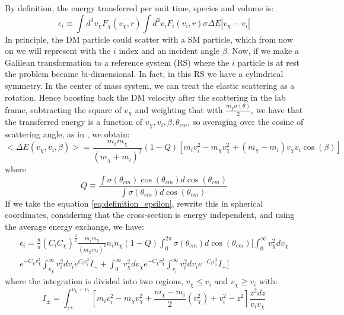 By definition, the energy transferred per unit time, species and volume is:
\begin{equation}
\label{eq:definition_epsilon}
    \epsilon_i\equiv \int d^3v_{\chi}F_{\chi}(v_{\chi},r)\int d^3v_i F_i(v_i,r)  \sigma \Delta E |v_{\chi}-v_i|
\end{equation}
In principle, the DM particle could scatter with a SM particle, which from now on we will represent with the $i$ index and an incident angle $\beta$. Now, if we make a Galilean transformation to a reference system (RS) where the $i$ particle is at rest the problem became bi-dimensional. In fact, in this RS  we have a cylindrical symmetry. In the center of mass system, we can treat the elastic scattering as a rotation. Hence boosting back the DM velocity after the scattering in the lab frame, subtracting the square of $v_{\chi}$ and weighting that with $\frac{m_{\chi}\sigma(\theta)}{2}$, we have that the transferred energy is a function of $v_{\chi},v_i,\beta,\theta_{cm}$, so averaging over the cosine of scattering angle, as in  \cite{SpergelPress_Cond}, we obtain:
\begin{equation}
    \Big< \Delta E (v_{\chi},v_i,\beta)\Big>=\frac{m_im_{\chi}}{(m_{\chi}+m_i)^2}(1-Q)[m_iv_i^2-m_{\chi}v_{\chi}^2+(m_{\chi}-m_i)v_{\chi}v_i\cos(\beta)]
\end{equation}
where
\begin{equation*}
    Q\equiv \frac{\int \sigma(\theta_{cm})\cos(\theta_{cm})d\cos(\theta_{cm})}{\int \sigma(\theta_{cm})d\cos(\theta_{cm})}
\end{equation*}
If we take the equation \ref{eq:definition_epsilon}, rewrite this in spherical coordinates, considering that the cross-section is energy independent, and using the average energy exchange, we have:
\begin{equation*}
\begin{split}
    \epsilon_i=\frac{8}{\pi}(C_iC_{\chi})^{\frac{3}{2}}\frac{m_im_{\chi}}{(m_{\chi}m_{i})^2}n_in_{\chi}(1-Q)\int_0^{2\pi} \sigma(\theta_{cm})d\cos(\theta_{cm}) \Bigg[\int_0^{\infty}v^2_{\chi}dv_{\chi} \\
    e^{-C_{\chi}v_{\chi}^2}\int_{v_{\chi}}^{\infty}v_i^2dv_i e^{C_iv_i^2}I_-+\int_0^{\infty}v^2_{\chi}dv_{\chi} e^{-C_{\chi}v_{\chi}^2}\int_{v_{i}}^{\infty}v_i^2dv_i e^{-C_iv_i^2}I_+\Bigg]  
\end{split}
\end{equation*}
where the integration is divided into two regions, $v_{\chi}\leq v_i$ and $v_{\chi}\geq v_i$ with:
\begin{equation*}
    I_{\pm}=\int_{z^{\pm}}^{v_{\chi}+v_i}[m_i v_i^2-m_{\chi}v_{\chi}^2+\frac{m_{\chi}-m_{i}}{2}(v_{\chi}^2)+v_i^2-z^2]\frac{z^2dz}{v_iv_{\chi}}
\end{equation*}

